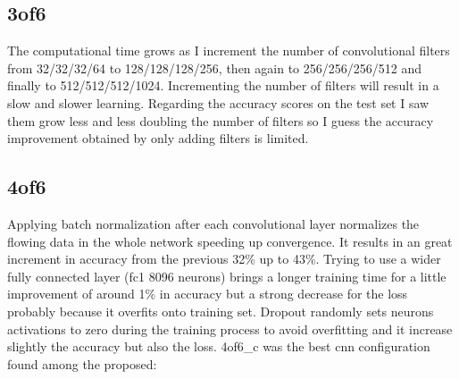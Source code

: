 \documentclass[11pt]{article}
\begin{document}
\subsection{3of6}
The computational time grows as I increment the number of convolutional filters from 32/32/32/64 to 128/128/128/256, then again to 256/256/256/512 and finally to 512/512/512/1024. Incrementing the number of filters will result in a slow and slower learning. \newline
Regarding the accuracy scores on the test set I saw them grow less and less doubling the number of filters so I guess the accuracy improvement obtained by only adding filters is limited.
\subsection{4of6}
Applying batch normalization after each convolutional layer normalizes the flowing data in the whole network speeding up convergence. It results in an great increment in accuracy from the previous 32\% up to 43\%. \newline
Trying to use a wider fully connected layer (fc1 8096 neurons) brings a longer training time for a little improvement of around 1\% in accuracy but a strong decrease for the loss probably because it overfits onto training set. \newline
Dropout randomly sets neurons activations to zero during the training process to avoid overfitting and it increase slightly the accuracy but also the loss. \newline
4of6\_c was the best cnn configuration found among the proposed: \newline
\end{document}
